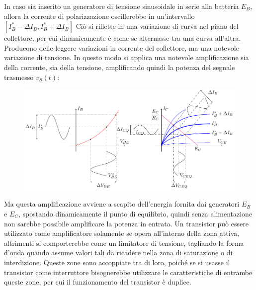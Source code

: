 \documentclass{article}
\numberwithin{equation}{subsection}
\begin{document}
In caso sia inserito un generatore di tensione sinusoidale in serie alla batteria $E_B$, allora la corrente di polarizzazione oscillerebbe in un'intervallo $[I_B^*-\Delta I_B,I_B^*+\Delta I_B]$ 
Ciò si riflette in una variazione di curva nel piano del collettore, per cui dinamicamente è come se alternasse tra una curva all'altra. Producono delle leggere variazioni in corrente 
del collettore, ma una notevole variazione di tensione. In questo modo si applica una notevole amplificazione sia della corrente, sia della 
tensione, amplificando quindi la potenza del segnale trasmesso $v_S(t)$:
\begin{figure}[H]%
    \centering
    \includegraphics{andamento-bjt-circuito-segnale.pdf}%
    \label{fig:andamento-bjt-circuito-segnale}
\end{figure}

Ma questa amplificazione avviene a scapito dell'energia fornita dai generatori $E_B$ e $E_C$, spostando dinamicamente il punto di equilibrio, quindi senza alimentazione non sarebbe 
possibile amplificare la potenza in entrata. 
Un transistor può essere utilizzato come amplificatore solamente se opera all'interno della zona attiva, altrimenti si comporterebbe come un limitatore 
di tensione, tagliando la forma d'onda quando assume valori tali da ricadere nella zona di saturazione o di interdizione. Queste zone sono accoppiate tra di loro, poiché 
se si usasse il transistor come interruttore bisognerebbe utilizzare le caratteristiche di entrambe queste zone, per cui il funzionamento del transistor è duplice. 
\end{document}
